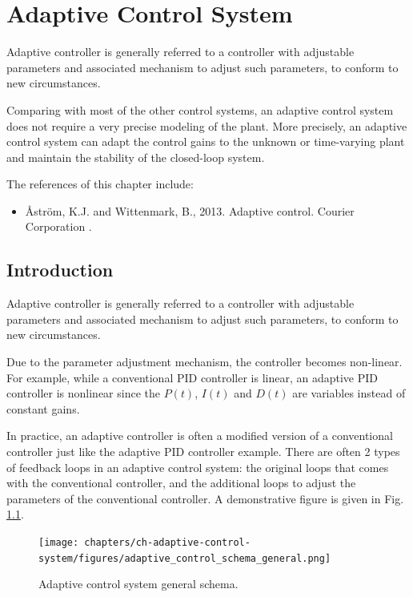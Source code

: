 \chapter{Adaptive Control System} \label{ch:acs}

Adaptive controller is generally referred to a controller with adjustable parameters and associated mechanism to adjust such parameters, to conform to new circumstances.

Comparing with most of the other control systems, an adaptive control system does not require a very precise modeling of the plant. More precisely, an adaptive control system can adapt the control gains to the unknown or time-varying plant and maintain the stability of the closed-loop system.

The references of this chapter include:
\begin{itemize}
	\item Åström, K.J. and Wittenmark, B., 2013. Adaptive control. Courier Corporation \cite{aastrom2013adaptive}.
\end{itemize}

\section{Introduction}

Adaptive controller is generally referred to a controller with adjustable parameters and associated mechanism to adjust such parameters, to conform to new circumstances.

Due to the parameter adjustment mechanism, the controller becomes non-linear. For example, while a conventional PID controller is linear, an adaptive PID controller is nonlinear since the $P(t)$, $I(t)$ and $D(t)$ are variables instead of constant gains.

In practice, an adaptive controller is often a modified version of a conventional controller just like the adaptive PID controller example. There are often 2 types of feedback loops in an adaptive control system: the original loops that comes with the conventional controller, and the additional loops to adjust the parameters of the conventional controller. A demonstrative figure is given in Fig. \ref{ch:acs:fig:adaptive_control_schema_general}.

\begin{figure}
	\centering
	\texttt{[image: chapters/ch-adaptive-control-system/figures/adaptive\_control\_schema\_general.png]}
	\caption{Adaptive control system general schema.} \label{ch:acs:fig:adaptive_control_schema_general}
\end{figure}

